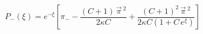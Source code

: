 \begin{equation}\label{15}
  P_-(\xi) = e^{-\xi} \left[  \pi_- - \frac{(C+1)\, \vec{\pi}\,{}^2}{2\kappa
  C}+\frac{(C+1)^2\, \vec{\pi}\,{}^2}{2\kappa C(1 + C\,
  e^\xi)}\right]
  \end{equation}

